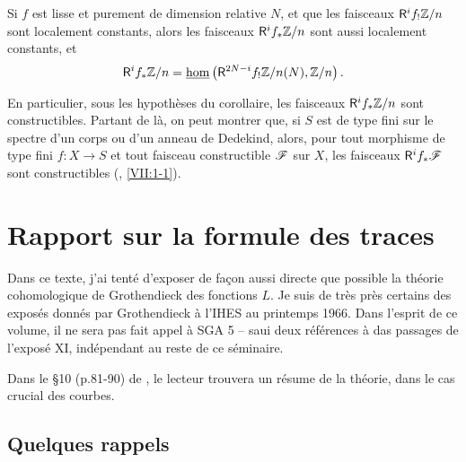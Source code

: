 \documentclass[oneside]{book}
\begin{document}
\begin{corollary}\label{I:6-4-1}
Si $f$ est lisse et purement de dimension relative $N$, et que les faisceaux 
$\mathsf{R}^i f_! \mathbb{Z}/n$ sont localement constants, alors les faisceaux 
$\mathsf{R}^i f_* \mathbb{Z}/n$ sont aussi localement constants, et 
\[
  \mathsf{R}^i f_* \mathbb{Z}/n = \underline{\hom}\left(\mathsf{R}^{2 N-i} f_! \mathbb{Z}/n(N),\mathbb{Z}/n\right)\text{.}
\]
\end{corollary}

En particulier, sous les hypothèses du corollaire, les faisceaux 
$\mathsf{R}^i f_* \mathbb{Z}/n$ sont constructibles. Partant de là, on peut montrer que, si 
$S$ est de type fini sur le spectre d'un corps ou d'un anneau de Dedekind, 
alors, pour tout morphisme de type fini $f:X\to S$ et tout faisceau 
constructible $\mathscr{F}$ sur $X$, les faisceaux $\mathsf{R}^i f_* \mathscr{F}$ sont constructibles 
(, \ref{VII:1-1}). 




















\chapter{Rapport sur la formule des traces}\label{II}

Dans ce texte, j'ai tenté d'exposer de façon aussi directe que possible la 
théorie cohomologique de Grothendieck des fonctions $L$. Je suis de très près 
certains des exposés donnés par Grothendieck à l'IHES au printemps 1966. Dans 
l'esprit de ce volume, il ne sera pas fait appel à SGA 5 -- saui deux 
références à das passages de l'exposé XI, indépendant au reste de ce 
séminaire. 

Dans le \S 10 (p.81-90) de \cite{II:1}, le lecteur trouvera un résume de la 
théorie, dans le cas crucial des courbes. 










\section{Quelques rappels}\label{II:1}
\end{document}

